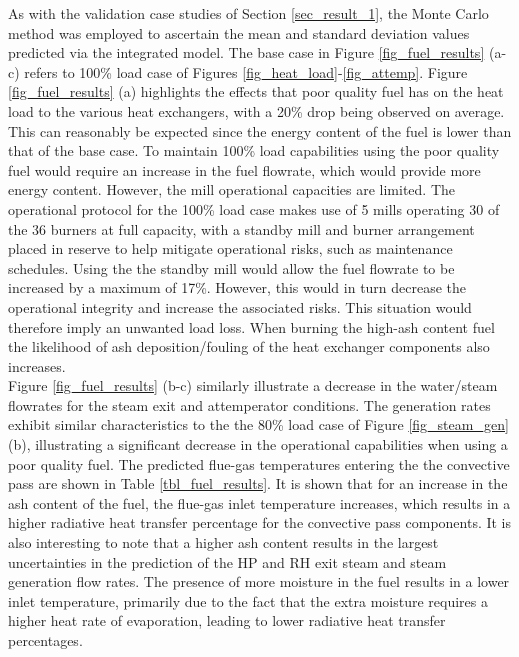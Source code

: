 \documentclass[a4paper,fleqn]{cas-sc}
\begin{document}
As with the validation case studies of Section \ref{sec_result_1}, the Monte Carlo method was employed to ascertain the mean and standard deviation values predicted via the integrated model. The base case in Figure \ref{fig_fuel_results} (a-c) refers to 100\% load case of Figures \ref{fig_heat_load}-\ref{fig_attemp}. Figure \ref{fig_fuel_results}  (a) highlights the effects that poor quality fuel has on the heat load to the various heat exchangers, with a 20\% drop being observed on average. This can reasonably be expected since the energy content of the fuel is lower than that of the base case. To maintain 100\% load capabilities using the poor quality fuel would require an increase in the fuel flowrate, which would provide more energy content. However, the mill operational capacities are limited. The operational protocol for the 100\% load case makes use of 5 mills operating 30 of the 36 burners at full capacity, with a standby mill and burner arrangement placed in reserve to help mitigate operational risks, such as maintenance schedules. Using the the standby mill would allow the fuel flowrate to be increased by a maximum of 17\%. However, this would in turn decrease the operational integrity and increase the associated risks. This situation would therefore imply an unwanted load loss. When burning the high-ash content fuel the likelihood of ash deposition/fouling of the heat exchanger components also increases.\\

Figure \ref{fig_fuel_results} (b-c) similarly illustrate a decrease in the water/steam flowrates for the steam exit and attemperator conditions. The generation rates exhibit similar characteristics to the the 80\% load case of Figure \ref{fig_steam_gen} (b), illustrating a significant decrease in the operational capabilities when using a poor quality fuel. The predicted flue-gas temperatures entering the the convective pass are shown in Table \ref{tbl_fuel_results}. It is shown that for an increase in the ash content of the fuel, the flue-gas inlet temperature increases, which results in a higher radiative heat transfer percentage for the convective pass components. It is also interesting to note that a higher ash content results in the largest uncertainties in the prediction of the HP and RH exit steam and steam generation flow rates. The presence of more moisture in the fuel results in a lower inlet temperature, primarily due to the fact that the extra moisture requires a higher heat rate of evaporation, leading to lower radiative heat transfer percentages.\\
\end{document}

